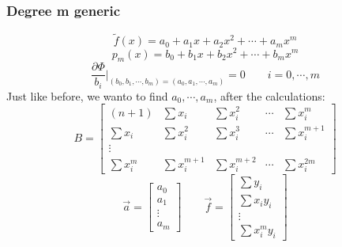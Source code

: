     \subsubsection{Degree m generic}
    $$
    \tilde{f}(x)=a_0+a_1x+a_2x^2+\cdots+a_mx^m
    $$
    $$
    p_m(x)=b_0+b_1x+b_2x^2+\cdots+b_mx^m
    $$
    $$
    \frac{
        \partial\Phi
    }{b_i}\Big|_{(b_0,b_1,\cdots,b_m)=(a_0,a_1,\cdots,a_m)}=0\qquad i=0,\cdots,m
    $$
    Just like before, we wanto to find $a_0,\cdots,a_m$, after the calculations:
    $$
    B=\begin{bmatrix}
        (n+1) & \sum x_i & \sum x_i^2 & \cdots & \sum x_i^m\\
        \sum x_i & \sum x_i^2 & \sum x_i^3 & \cdots & \sum x_i^{m+1}\\
        \vdots\\
        \sum x_i^m & \sum x_i^{m+1} & \sum x_i^{m+2} & \cdots & \sum x_i^{2m}
    \end{bmatrix}
    $$
    $$
    \overrightarrow{a}=\begin{bmatrix}
        a_0\\
        a_1\\
        \vdots\\
        a_m
    \end{bmatrix}\qquad
    \overrightarrow{f}=\begin{bmatrix}
        \sum y_i\\
        \sum x_iy_i\\
        \vdots\\
        \sum x_i^my_i
    \end{bmatrix}
    $$

